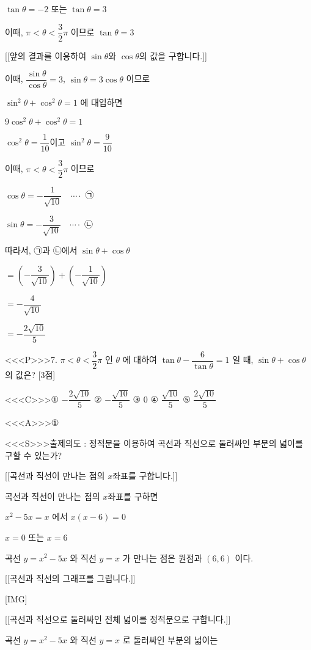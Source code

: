 \documentclass{oblivoir}
\begin{document}
$\tan \theta=-2$ 또는 $\tan \theta=3$

이때, $\pi< \theta< \dfrac{3}{2} \pi$ 이므로
$\tan \theta=3$

[[앞의 결과를 이용하여 $\sin \theta$와 $\cos \theta$의 값을 구합니다.]]

이때,
$\dfrac{\sin \theta}{\cos \theta}=3$,
$\sin \theta=3 \cos \theta$
이므로

$\sin ^{2} \theta+\cos ^{2} \theta=1$ 에 대입하면

$9 \cos ^{2} \theta+\cos ^{2} \theta=1$

$ \cos ^{2} \theta=\dfrac{1}{10}$이고 $ \sin ^{2} \theta=\dfrac{9}{10}$

이때, $\pi< \theta< \dfrac{3}{2} \pi$ 이므로

$\cos \theta=-\dfrac{1}{\sqrt{10}} \quad \cdots \cdot$ ㉠

$\sin \theta=-\dfrac{3}{\sqrt{10}} \quad \cdots \cdot$ ㉡

따라서, ㉠과 ㉡에서 $\sin \theta+\cos \theta$

$=\left(-\dfrac{3}{\sqrt{10}}\right)+\left(-\dfrac{1}{\sqrt{10}}\right)$

$=-\dfrac{4}{\sqrt{10}}$

$=-\dfrac{2 \sqrt{10}}{5}$



<<<P>>>7. $\pi< \theta< \dfrac{3}{2} \pi$ 인 $\theta$ 에 대하여 $\tan \theta-\dfrac{6}{\tan \theta}=1$ 일 때, $\sin \theta+\cos \theta$ 의 값은? [3점]

<<<C>>>① $-\dfrac{2 \sqrt{10}}{5}$
② $-\dfrac{\sqrt{10}}{5}$
③ $0$
④ $\dfrac{\sqrt{10}}{5}$
⑤ $\dfrac{2 \sqrt{10}}{5}$


<<<A>>>①

<<<S>>>출제의도 : 정적분을 이용하여 곡선과 직선으로 둘러싸인 부분의 넓이를 구할 수 있는가?

[[곡선과 직선이 만나는 점의 $x$좌표를 구합니다.]]

곡선과 직선이 만나는 점의 $x$좌표를 구하면 

$x^{2}-5 x=x$ 에서 $x(x-6)=0$

$x=0$ 또는 $x=6$

곡선 $y=x^{2}-5 x$ 와 직선 $y=x$ 가 만나는 점은 원점과 $(6,6)$ 이다.

[[곡선과 직선의 그래프를 그립니다.]]

[IMG]

[[곡선과 직선으로 둘러싸인 전체 넓이를 정적분으로 구합니다.]]

곡선 $y=x^{2}-5 x$ 와 직선 $y=x$ 로 둘러싸인 부분의 넓이는
\end{document}
